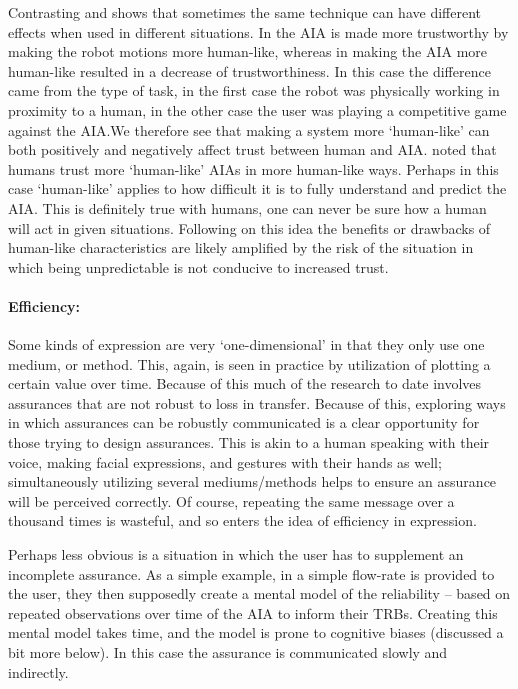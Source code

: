     Contrasting \cite{Dragan2013-wd} and \cite{Wu2016-ei} shows that sometimes the same technique can have different effects when used in different situations. In \cite{Dragan2013-wd} the AIA is made more trustworthy by making the robot motions more human-like, whereas in \cite{Wu2016-ei} making the AIA more human-like resulted in a decrease of trustworthiness. In this case the difference came from the type of task, in the first case the robot was physically working in proximity to a human, in the other case the user was playing a competitive game against the AIA.We therefore see that making a system more `human-like' can both positively and negatively affect trust between human and AIA. \citet{Tripp2011-rx} noted that humans trust more `human-like' AIAs in more human-like ways. Perhaps in this case `human-like' applies to how difficult it is to fully understand and predict the AIA. This is definitely true with humans, one can never be sure how a human will act in given situations. Following on this idea the benefits or drawbacks of human-like characteristics are likely amplified by the risk of the situation in which being unpredictable is not conducive to increased trust.

    \paragraph{Efficiency:} Some kinds of expression are very `one-dimensional' in that they only use one medium, or method. This, again, is seen in practice by utilization of plotting a certain value over time. Because of this much of the research to date involves assurances that are not robust to loss in transfer. Because of this, exploring ways in which assurances can be robustly communicated is a clear opportunity for those trying to design assurances. This is akin to a human speaking with their voice, making facial expressions, and gestures with their hands as well; simultaneously utilizing several mediums/methods helps to ensure an assurance will be perceived correctly. Of course, repeating the same message over a thousand times is wasteful, and so enters the idea of efficiency in expression.

    Perhaps less obvious is a situation in which the user has to supplement an incomplete assurance. As a simple example, in \cite{Muir1994-ow} a simple flow-rate is provided to the user, they then supposedly create a mental model of the reliability -- based on repeated observations over time of the AIA to inform their TRBs. Creating this mental model takes time, and the model is prone to cognitive biases (discussed a bit more below). In this case the assurance is communicated slowly and indirectly.
    
